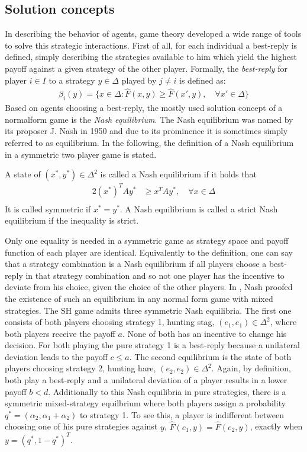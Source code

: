 \subsection{Solution concepts}
\label{sec:traditionalconcepts}
In describing the behavior of agents, game theory developed a wide range of 
tools to solve this strategic interactions. First of all, for each individual
a best-reply is defined, simply describing the strategies available to him 
which yield the highest payoff against a given strategy of the other player.
Formally, the \textit{best-reply} for player $i \in I$ to a 
strategy $y \in \Delta$ played by $j \neq i$ is defined as:
\begin{align}
        \beta_i(y) = \{x \in \Delta: \hat{F}(x,y) \geq \hat{F}(x',y), 
        \quad \forall x' \in \Delta\}
\end{align}
Based on agents choosing a best-reply, the mostly used solution concept of
a normalform game is the \textit{Nash equilibrium}.
The Nash equilibrium was named by its proposer J. Nash in 1950 
and due to its prominence it is sometimes simply referred to as equilibrium.
In the following, the definition of a Nash equilibrium in a symmetric two
player game is stated. 
\begin{mydef}
        \label{def:nashequilibrium}
        A state of $(x^*,y^*) \in \Delta^2$ is called a Nash equilibrium if 
        it holds that
        \begin{alignat*}{2}
                (x^*)^T A y^* &\geq x^T A y^*, \quad \forall x \in \Delta \\
        \end{alignat*}
It is called symmetric if $x^* = y^*$. A Nash equilibrium is called a 
strict Nash equilibrium if the inequality is strict.
\end{mydef}
Only one equality is needed in a symmetric game as strategy space and
payoff function of each player are identical.
Equivalently to the definition, one can say that a strategy combination 
is a Nash equilibrium if all players choose a best-reply in that strategy 
combination and so not one player has the incentive to deviate from his 
choice, given the choice of the other players.
In \textcite{nash_equilibrium_1950}, Nash proofed the existence of such 
an equilibrium in any normal form game with mixed strategies. 
The SH game admits three symmetric Nash equilibria. The first one consists
of both players choosing strategy 1, hunting stag, $(e_1,e_1) \in
\Delta^2$, where both players receive the payoff $a$. 
None of both has an incentive to change his decision. For both
playing the pure strategy 1 is a best-reply because a unilateral deviation 
leads to the payoff $c \leq a$.
The second equilibrium is the state of 
both players choosing strategy 2, hunting hare, $(e_2,e_2)
\in \Delta^2$. Again, by definition, both play a best-reply and a unilateral 
deviation of a player results in a lower payoff $b<d$.
Additionally to this Nash equilibria in pure strategies, there is a symmetric
mixed-strategy equilbrium where both players assign a probability 
$q^*=(\alpha_2,\alpha_1 + \alpha_2)$ to strategy 1. 
To see this, a player is indifferent between choosing one of his pure
strategies against $y$, $\hat{F}(e_1,y) = \hat{F}(e_2,y)$, exactly
when $y=(q^*,1-q^*)^T$.


